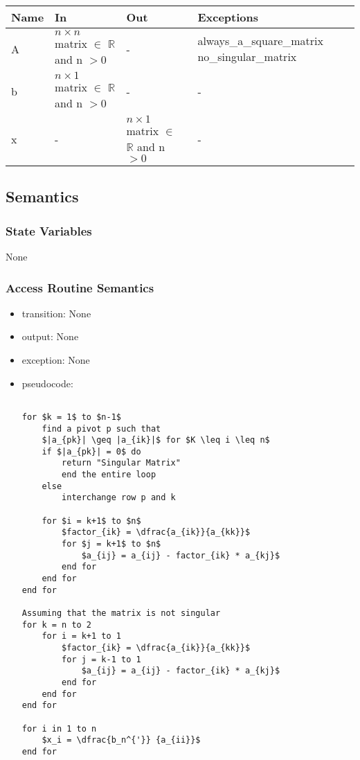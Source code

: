 \documentclass[12pt, titlepage]{article}
\begin{document}
\begin{center}
\begin{tabular}{p{2cm} p{4cm} p{4cm} p{2cm}}
\hline
\textbf{Name} & \textbf{In} & \textbf{Out} & \textbf{Exceptions} \\
\hline

A & $n \times n$ matrix $\in$ $\mathbb{R}$ and n $> 0$ & - &  always\_a\_square\_matrix no\_singular\_matrix \\
b & $n \times 1$ matrix $\in$ $\mathbb{R}$ and n $> 0$ & - & - \\
x & - & $n \times 1$ matrix $\in$ $\mathbb{R}$ and n $> 0$ & - \\
\hline
\end{tabular}
\end{center}

\subsection{Semantics}

\subsubsection{State Variables}

None

\subsubsection{Access Routine Semantics}

\noindent %
\begin{itemize}
\item transition: None%
\item output: None%
\item exception: None%
\item pseudocode:
\begin{lstlisting}[mathescape=true]

for $k = 1$ to $n-1$
    find a pivot p such that
    $|a_{pk}| \geq |a_{ik}|$ for $K \leq i \leq n$
    if $|a_{pk}| = 0$ do
        return "Singular Matrix"
        end the entire loop
    else 
        interchange row p and k
        
    for $i = k+1$ to $n$
        $factor_{ik} = \dfrac{a_{ik}}{a_{kk}}$
        for $j = k+1$ to $n$
            $a_{ij} = a_{ij} - factor_{ik} * a_{kj}$
        end for
    end for
end for

Assuming that the matrix is not singular
for k = n to 2
    for i = k+1 to 1
        $factor_{ik} = \dfrac{a_{ik}}{a_{kk}}$
        for j = k-1 to 1
            $a_{ij} = a_{ij} - factor_{ik} * a_{kj}$
        end for
    end for
end for

for i in 1 to n
    $x_i = \dfrac{b_n^{'}} {a_{ii}}$
end for

\end{lstlisting}
\end{itemize}
\end{document}
